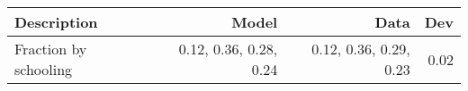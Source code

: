 \begin{tabular}{lrrr}
\hline
Description & Model  & Data  & Dev  \\ 
\hline
Fraction by schooling & 0.12, 0.36, 0.28, 0.24  & 0.12, 0.36, 0.29, 0.23  & 0.02  \\ 
\hline
\end{tabular}%

